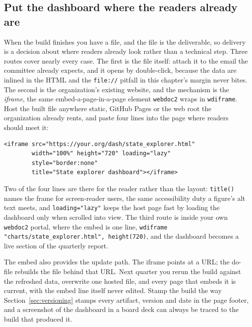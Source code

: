\documentclass[
    a4paper,
    fontsize=10pt,
    twoside=true,
    numbers=noenddot,
]{kaobook}
\begin{document}
\subsection{Put the dashboard where the readers already are}
When the build finishes you have a file, and the file is the deliverable, so delivery is a decision about where readers already look rather than a technical step. Three routes cover nearly every case. The first is the file itself: attach it to the email the committee already expects, and it opens by double-click, because the data are inlined in the HTML and the \texttt{file://} pitfall in this chapter's margin never bites. The second is the organization's existing website, and the mechanism is the \emph{iframe}, the same embed-a-page-in-a-page element \texttt{webdoc2} wraps in \texttt{wdiframe}. Host the built file anywhere static, GitHub Pages or the web root the organization already rents, and paste four lines into the page where readers should meet it:
\par
{\footnotesize
\begin{verbatim}
<iframe src="https://your.org/dash/state_explorer.html"
        width="100%" height="720" loading="lazy"
        style="border:none"
        title="State explorer dashboard"></iframe>
\end{verbatim}
}
Two of the four lines are there for the reader rather than the layout: \texttt{title()} names the frame for screen-reader users, the same accessibility duty a figure's alt text meets, and \texttt{loading="lazy"} keeps the host page fast by loading the dashboard only when scrolled into view. The third route is inside your own \texttt{webdoc2} portal, where the embed is one line, \texttt{wdiframe "charts/state\_explorer.html", height(720)}, and the dashboard becomes a live section of the quarterly report.

The embed also provides the update path. The iframe points at a URL; the do-file rebuilds the file behind that URL. Next quarter you rerun the build against the refreshed data, overwrite one hosted file, and every page that embeds it is current, with the embed line itself never edited. Stamp the build the way Section~\ref{sec:versioning} stamps every artifact, version and date in the page footer, and a screenshot of the dashboard in a board deck can always be traced to the build that produced it.
\end{document}
